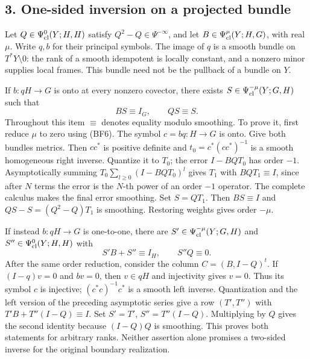 \documentclass[
  11pt,
]{article}
\makeatletter
\let\ReaderOriginalAnchorStart\hyper@anchorstart
\let\ReaderOriginalAnchorEnd\hyper@anchorend
\let\ReaderPendingAliases\@empty
\def\ReaderArmAliases#1{\gdef\ReaderPendingAliases{#1}}
\def\hyper@anchorstart#1{\ReaderIfNativeAnchorTF{#1}{\ReaderPendingAliases\global\let\ReaderPendingAliases\@empty}{}\ReaderOriginalAnchorStart{#1}}
\makeatother
\begin{document}
\ReaderArmAliases{\ReaderOriginalAnchorStart{AN03-GFB-003}\ReaderOriginalAnchorEnd\begingroup\expandafter\def\csname @currentHref\endcsname{AN03-GFB-003}\label{AN03-GFB-003}\endgroup\ReaderOriginalAnchorStart{an03-gfb-003-one-sided-inversion-on-a-projected-bundle}\ReaderOriginalAnchorEnd\begingroup\expandafter\def\csname @currentHref\endcsname{an03-gfb-003-one-sided-inversion-on-a-projected-bundle}\label{an03-gfb-003-one-sided-inversion-on-a-projected-bundle}\endgroup\ReaderOriginalAnchorStart{3-one-sided-inversion-on-a-projected-bundle}\ReaderOriginalAnchorEnd\begingroup\expandafter\def\csname @currentHref\endcsname{3-one-sided-inversion-on-a-projected-bundle}\label{3-one-sided-inversion-on-a-projected-bundle}\endgroup\ReaderOriginalAnchorStart{one-sided-inversion-on-a-projected-bundle}\ReaderOriginalAnchorEnd}
\subsection{3. One-sided inversion on a projected
bundle}\label{one-sided-inversion-on-a-projected-bundle}

Let \(Q\in\Psi^0_{\rm cl}(Y;H,H)\) satisfy \(Q^2-Q\in\Psi^{-\infty}\),
and let \(B\in\Psi^\mu_{\rm cl}(Y;H,G)\), with real \(\mu\). Write
\(q,b\) for their principal symbols. The image of \(q\) is a smooth
bundle on \(T^*Y\setminus0\): the rank of a smooth idempotent is locally
constant, and a nonzero minor supplies local frames. This bundle need
not be the pullback of a bundle on \(Y\).

If \(b:qH\to G\) is onto at every nonzero covector, there exists
\(S\in\Psi^{-\mu}_{\rm cl}(Y;G,H)\) such that \[
 BS\equiv I_G,\qquad QS\equiv S.
 \tag{BF8}
\] Throughout this item \(\equiv\) denotes equality modulo smoothing. To
prove it, first reduce \(\mu\) to zero using (BF6). The symbol
\(c=bq:H\to G\) is onto. Give both bundles metrics. Then \(cc^*\) is
positive definite and \(t_0=c^*(cc^*)^{-1}\) is a smooth homogeneous
right inverse. Quantize it to \(T_0\); the error \(I-BQT_0\) has order
\(-1\). Asymptotically summing \(T_0\sum_{l\geq0}(I-BQT_0)^l\) gives
\(T_1\) with \(BQT_1\equiv I\), since after \(N\) terms the error is the
\(N\)-th power of an order \(-1\) operator. The complete calculus makes
the final error smoothing. Set \(S=QT_1\). Then \(BS\equiv I\) and
\(QS-S=(Q^2-Q)T_1\) is smoothing. Restoring weights gives order
\(-\mu\).

If instead \(b:qH\to G\) is one-to-one, there are
\(S'\in\Psi^{-\mu}_{\rm cl}(Y;G,H)\) and
\(S''\in\Psi^0_{\rm cl}(Y;H,H)\) with \[
 S'B+S''\equiv I_H,\qquad S''Q\equiv0.
 \tag{BF9}
\] After the same order reduction, consider the column \(C=(B,I-Q)^t\).
If \((I-q)v=0\) and \(bv=0\), then \(v\in qH\) and injectivity gives
\(v=0\). Thus its symbol \(c\) is injective; \((c^*c)^{-1}c^*\) is a
smooth left inverse. Quantization and the left version of the preceding
asymptotic series give a row \((T',T'')\) with \(T'B+T''(I-Q)\equiv I\).
Set \(S'=T'\), \(S''=T''(I-Q)\). Multiplying by \(Q\) gives the second
identity because \((I-Q)Q\) is smoothing. This proves both statements
for arbitrary ranks. Neither assertion alone promises a two-sided
inverse for the original boundary realization.
\end{document}
